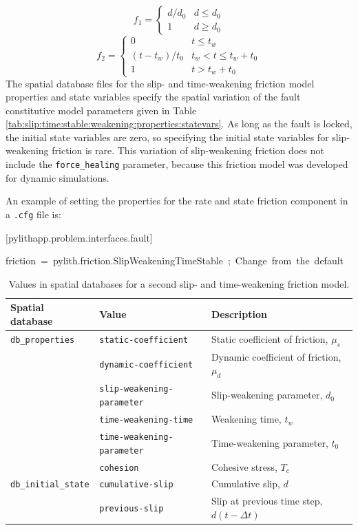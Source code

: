 \begin{equation}
f_{1}=\begin{cases}
d/d_{0} & d\leq d_{0}\\
1 & d\ge d_{0}
\end{cases}
\end{equation}
\begin{equation}
f_{2}=\begin{cases}
0 & t\leq t_{w}\\
(t-t_{w})/t_{0} & t_{w}<t\le t_{w}+t_{0}\\
1 & t>t_{w}+t_{0}
\end{cases}
\end{equation}
The spatial database files for the slip- and time-weakening friction
model properties and state variables specify the spatial variation
of the fault constitutive model parameters given in Table \vref{tab:slip:time:stable:weakening:properties:statevars}.
As long as the fault is locked, the initial state variables are zero,
so specifying the initial state variables for slip-weakening friction
is rare. This variation of slip-weakening friction does not include
the \texttt{force\_healing} parameter, because this friction model
was developed for dynamic simulations.

An example of setting the properties for the rate and state friction
component in a \texttt{.cfg} file is:
\begin{lyxcode}
{[}pylithapp.problem.interfaces.fault{]}

friction~=~pylith.friction.SlipWeakeningTimeStable~;~Change~from~the~default


\end{lyxcode}
\noindent \begin{center}
\begin{table}[H]
\noindent \centering{}\caption{\label{tab:slip:time:stable:weakening:properties:statevars}Values
in spatial databases for a second slip- and time-weakening friction
model.}
\medskip{}
\begin{tabular}{|l|l|>{\raggedright}p{2.5in}|}
\hline 
\textbf{Spatial database} & \textbf{Value} & \textbf{Description}\tabularnewline
\hline 
\hline 
\texttt{db\_properties} & \texttt{static-coefficient} & Static coefficient of friction, $\mu_{s}$\tabularnewline
\cline{2-3} 
 & \texttt{dynamic-coefficient} & Dynamic coefficient of friction, $\mu_{d}$\tabularnewline
\cline{2-3} 
 & \texttt{slip-weakening-parameter} & Slip-weakening parameter, $d_{0}$\tabularnewline
\cline{2-3} 
 & \texttt{time-weakening-time} & Weakening time, $t_{w}$\tabularnewline
\cline{2-3} 
 & \texttt{time-weakening-parameter} & Time-weakening parameter, $t_{0}$\tabularnewline
\cline{2-3} 
 & \texttt{cohesion} & Cohesive stress, $T_{c}$\tabularnewline
\hline 
\texttt{db\_initial\_state} & \texttt{cumulative-slip} & Cumulative slip, $d$\tabularnewline
\cline{2-3} 
 & \texttt{previous-slip} & Slip at previous time step, $d(t-\Delta t)$\tabularnewline
\hline 
\end{tabular}
\end{table}

\par\end{center}


